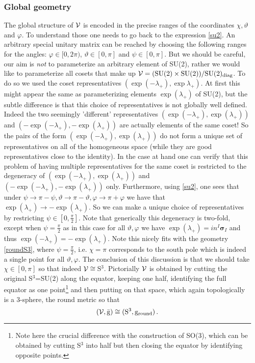 \documentclass[11pt,a4paper]{article}
\def\calv{{\cal V}}
\def\rg{{\mathrm{g}}}
\begin{document}
\subsubsection{Global geometry}    
    The global structure of $\calv$ is encoded in the precise ranges of the coordinates $\chi, \vartheta$ and $\varphi$. To understand those one needs to go back to the expression \eqref{su2}.
    An arbitrary special unitary matrix can be reached by choosing the following ranges for the angles: $\varphi\in[0,2\pi)$, $\vartheta\in[0,\pi]$ and $\psi\in[0,\pi]$. But we should be careful, our aim is {\it not} to parameterize an arbitrary element of SU(2), rather we would like to parameterize all cosets that make up $\calv=(\mathrm{SU}(2)\times\mathrm{SU}(2))/\mathrm{SU}(2)_\mathrm{diag}$. To do so we used the coset representatives $(\exp(-\lambda_+),\exp\lambda_+)$. At first this might appear the same as parameterizing elements $\exp(\lambda_+)$ of SU(2), but the subtle difference is that this choice of representatives is not globally well defined. Indeed the two seemingly 'different' representatives $(\exp(-\lambda_+),\exp(\lambda_+))$ and $(-\exp(-\lambda_+),-\exp(\lambda_+))$ are actually elements of the same coset! So the pairs of the form $(\exp(-\lambda_+),\exp(\lambda_+))$ do not form a unique set of representatives on all of the homogeneous space (while they are good representatives close to the identity). In the case at hand one can verify that this problem of having multiple representatives for the same coset is restricted to the degeneracy of $(\exp(-\lambda_+),\exp(\lambda_+))$ and $(-\exp(-\lambda_+),-\exp(\lambda_+))$ only. Furthermore, using \eqref{su2}, one sees that under $\psi\rightarrow \pi-\psi, \vartheta\rightarrow \pi-\vartheta, \varphi\rightarrow \pi+\varphi$ we have that $\exp(\lambda_+)\rightarrow -\exp(\lambda_+)$. So we can make a unique choice of representatives by restricting $\psi\in [0,\frac{\pi}{2}]$. Note that generically this degeneracy is two-fold, except when $\psi=\frac{\pi}{2}$ as in this case for all $\vartheta, \varphi$ we have $\exp(\lambda_+)=in^I{\bm \sigma_I}$ and thus $\exp(-\lambda_+)=-\exp(\lambda_+)$. Note this nicely fits with the geometry \eqref{roundS3}, where $\psi=\frac{\pi}{2}$, i.e. $\chi=\pi$ corresponds to the south pole which is indeed a single point for all $\vartheta, \varphi$. The conclusion of this discussion is that we should take $\chi\in[0,\pi]$ so that indeed $\calv\cong\, $S$^3$. Pictorially $\calv$ is obtained by cutting the original S${}^3$=SU(2) along the equator, keeping one half, identifying the full equator as one point\footnote{Note here the crucial difference with the construction of SO(3), which can be obtained by cutting S${}^3$ into half but then closing the equator by identifying opposite points.} and then putting on that space, which again topologically is a 3-sphere, the round metric so that
    \begin{equation}
    (\calv,\bar\rg)\cong (\mathrm{S}^3,\rg_{\mathrm{round}})\,.
    \end{equation} 
    
\end{document}

